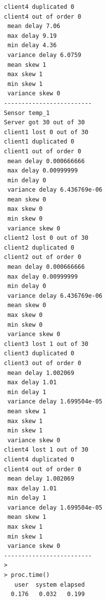 \begin{verbatim}
client4 duplicated 0 
client4 out of order 0 
 mean delay 7.06 
 max delay 9.19 
 min delay 4.36 
 variance delay 6.0759 
 mean skew 1 
 max skew 1 
 min skew 1 
 variance skew 0 
-------------------------
Sensor temp_1 
Server got 30 out of 30 
client1 lost 0 out of 30 
client1 duplicated 0 
client1 out of order 0 
 mean delay 0.000666666 
 max delay 0.00999999 
 min delay 0 
 variance delay 6.436769e-06 
 mean skew 0 
 max skew 0 
 min skew 0 
 variance skew 0 
client2 lost 0 out of 30 
client2 duplicated 0 
client2 out of order 0 
 mean delay 0.000666666 
 max delay 0.00999999 
 min delay 0 
 variance delay 6.436769e-06 
 mean skew 0 
 max skew 0 
 min skew 0 
 variance skew 0 
client3 lost 1 out of 30 
client3 duplicated 0 
client3 out of order 0 
 mean delay 1.002069 
 max delay 1.01 
 min delay 1 
 variance delay 1.699504e-05 
 mean skew 1 
 max skew 1 
 min skew 1 
 variance skew 0 
client4 lost 1 out of 30 
client4 duplicated 0 
client4 out of order 0 
 mean delay 1.002069 
 max delay 1.01 
 min delay 1 
 variance delay 1.699504e-05 
 mean skew 1 
 max skew 1 
 min skew 1 
 variance skew 0 
-------------------------
> 
> proc.time()
   user  system elapsed 
  0.176   0.032   0.199 
\end{verbatim}


